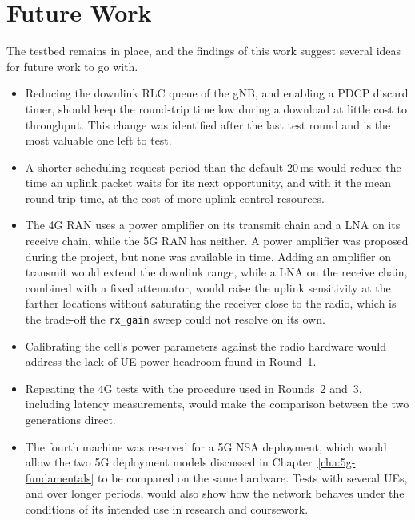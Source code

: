 \section{Future Work}
\label{sec:conclusions-future}

The testbed remains in place, and the findings of this work suggest several ideas for future work to go with.

\begin{itemize}
    \item Reducing the downlink \gls{RLC} queue of the \gls{gNB}, and enabling a \gls{PDCP} discard timer, should keep the round-trip time low during a download at little cost to throughput. This change was identified after the last test round and is the most valuable one left to test.

    \item A shorter scheduling request period than the default 20\,ms would reduce the time an uplink packet waits for its next opportunity, and with it the mean round-trip time, at the cost of more uplink control resources.

    \item The 4G \gls{RAN} uses a power amplifier on its transmit chain and a \gls{LNA} on its receive chain, while the 5G \gls{RAN} has neither. A power amplifier was proposed during the project, but none was available in time. Adding an amplifier on transmit would extend the downlink range, while a \gls{LNA} on the receive chain, combined with a fixed attenuator, would raise the uplink sensitivity at the farther locations without saturating the receiver close to the radio, which is the trade-off the \texttt{rx\_gain} sweep could not resolve on its own.

    \item Calibrating the cell's power parameters against the radio hardware would address the lack of \gls{UE} power headroom found in Round~1.

    \item Repeating the 4G tests with the procedure used in Rounds~2 and~3, including latency measurements, would make the comparison between the two generations direct.

    \item The fourth machine was reserved for a 5G \gls{NSA} deployment, which would allow the two 5G deployment models discussed in Chapter~\ref{cha:5g-fundamentals} to be compared on the same hardware. Tests with several \glspl{UE}, and over longer periods, would also show how the network behaves under the conditions of its intended use in research and coursework.
\end{itemize}

